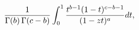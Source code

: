 \[\frac{1}{\mathop{\Gamma\/}\nolimits\!\left(b\right)\mathop{\Gamma\/}\nolimits%
\!\left(c-b\right)}\int_{0}^{1}\frac{t^{b-1}(1-t)^{c-b-1}}{(1-zt)^{a}}dt,\]